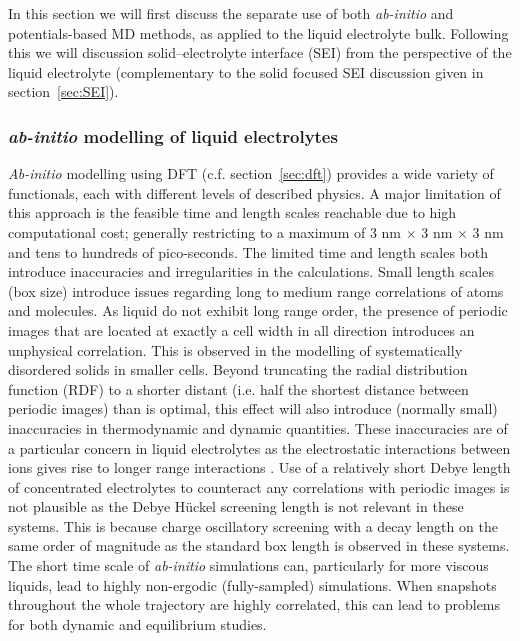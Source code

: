 \documentclass[../main.tex]{subfiles}
\begin{document}
In this section we will first discuss the separate use of both \textit{ab-initio} and potentials-based MD methods, as applied to the liquid electrolyte bulk. Following this we will discussion solid--electrolyte interface (SEI) from the perspective of the liquid electrolyte (complementary to the solid focused SEI discussion given in section~\ref{sec:SEI}).

\subsubsection{\textit{ab-initio} modelling of liquid electrolytes}
\textit{Ab-initio} modelling using DFT (c.f. section~\ref{sec:dft}) provides a wide variety of functionals, each with different levels of described physics. A major limitation of this approach is the feasible time and length scales reachable due to high computational cost; generally restricting to a maximum of 3 nm $\times$ 3 nm $\times$ 3 nm and tens to hundreds of pico-seconds. The limited time and length scales both introduce inaccuracies and irregularities in the calculations. Small length scales (box size) introduce issues regarding long to medium range correlations of atoms and molecules. As liquid do not exhibit long range order, the presence of periodic images that are located at exactly a cell width in all direction introduces an unphysical correlation. This is observed in the modelling of systematically disordered solids in smaller cells. Beyond truncating the radial distribution function (RDF) to a shorter distant (i.e. half the shortest distance between periodic images) than is optimal, this effect will also introduce (normally small) inaccuracies in thermodynamic and dynamic quantities\cite{Binder2009book, yeh_system-size_2004,botan_diffusion_2015,horbach_finite_1996}. These inaccuracies are of a particular concern in liquid electrolytes as the electrostatic interactions between ions gives rise to longer range interactions \cite{coles_correlation_2020}. Use of a relatively short Debye length of concentrated electrolytes to counteract any correlations with periodic images is not plausible as the Debye H\"{u}ckel screening length is not relevant in these systems. This is because charge oscillatory screening with a decay length on the same order of magnitude as the standard box length is observed in these systems\cite{coles_correlation_2020}. The short time scale of \textit{ab-initio} simulations can, particularly for more viscous liquids, lead to highly non-ergodic (fully-sampled) simulations. When snapshots throughout the whole trajectory are highly correlated\cite{frenkel_understanding_2002}, this can lead to problems for both dynamic and equilibrium studies. 
\end{document}
